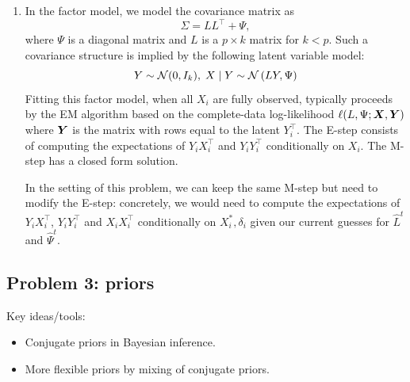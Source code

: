 \begin{enumerate}[label=(\alph*)]
\item In the factor model, we model the covariance matrix as
$$ \Sigma = L L^\top + \Psi,$$
where $\Psi$ is a diagonal matrix and $L$ is a $p \times k$ matrix for $k < p$. Such a covariance structure is implied by the following latent variable model:
$$ Y \sim \mathcal{N}(0, I_k), \; X \mid Y \sim \mathcal{N}\left(LY, \Psi\right)$$
Fitting this factor model, when all $X_i$ are fully observed, typically proceeds by the EM algorithm based on the complete-data log-likelihood $\ell(L, \Psi; \bm{X}, \bm{Y})$ where $\bm{Y}$ is the matrix with rows equal to the latent $Y_i^\top$. The E-step consists of computing the expectations of $Y_i X_i^\top$ and $Y_i Y_i^\top$ conditionally on $X_i$. The M-step has a closed form solution.

In the setting of this problem, we can keep the same M-step but need to modify the E-step: concretely, we would need to compute the expectations of  $Y_i X_i^\top$, $Y_i Y_i^\top$ and $X_i X_i^\top$ conditionally on $X_i^*, \delta_i$ given our current guesses for $\widehat{L}^t$ and $\widehat{\Psi}^t$.
\end{enumerate}

\subsection*{Problem 3: \citet{diaconis1985} priors}

Key ideas/tools:
\begin{itemize}
  \item Conjugate priors in Bayesian inference.
  \item More flexible priors by mixing of conjugate priors.
\end{itemize}

